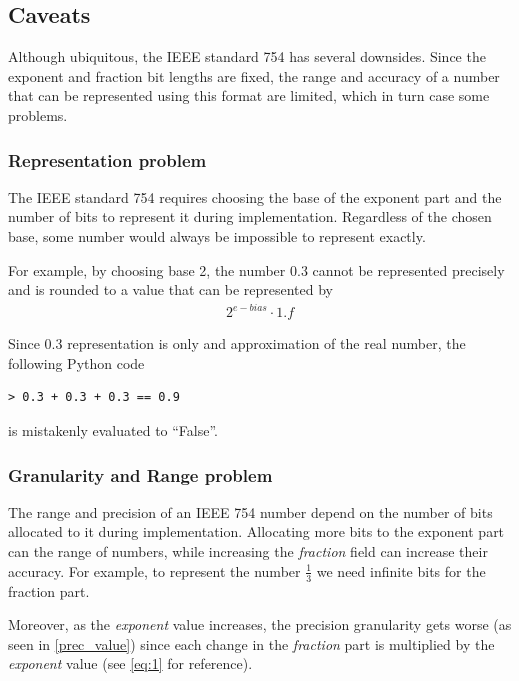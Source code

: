 \documentclass[10pt]{article}
\begin{document}
\subsection{Caveats}\label{sec:floatscaveats}

Although ubiquitous, the IEEE standard 754 has several downsides. Since the
exponent and fraction bit lengths are fixed, the range and accuracy of a number
that can be represented using this format are limited, which in turn case some
problems.

\subsubsection{Representation problem}\label{sec:accuracyproblem}

The IEEE standard 754 requires choosing the base of the exponent part and the
number of bits to represent it during implementation. Regardless of the chosen
base, some number would always be impossible to represent exactly.

For example, by choosing base 2, the number $0.3$ cannot be represented
precisely and is rounded to a value that can be represented by
\begin{align*}
  {2}^{e - bias}\cdot 1.f
\end{align*}

\noindent{}Since $0.3$ representation is only and approximation of the real number, the
following Python code
\begin{verbatim}
> 0.3 + 0.3 + 0.3 == 0.9
\end{verbatim}
is mistakenly evaluated to ``False''.

\subsubsection{Granularity and Range problem}\label{sec:gran-range-probl}

The range and precision of an IEEE 754 number depend on the number of bits
allocated to it during implementation.
Allocating more bits to the exponent part can the range of numbers, while
increasing the \textit{fraction} field can increase their accuracy.
For example, to represent the number $\frac{1}{3}$ we need infinite bits for the
fraction part.

Moreover, as the \textit{exponent} value increases, the precision granularity
gets worse (as seen in \autoref{prec_value}) since each change in the
\textit{fraction} part is multiplied by the \textit{exponent} value (see
\autoref{eq:1} for reference).
\end{document}
